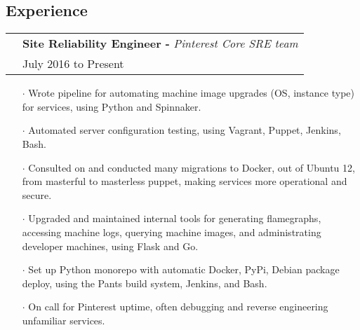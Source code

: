\documentclass[letterpaper, oneside, final]{scrartcl} %
\newcommand{\gray}{\rowcolor[gray]{.90}} %
\begin{document}
\begin{center}
\vspace{-0.8cm}

\section{Experience}

\renewcommand{\arraystretch}{1.3}

\begin{tabularx}{0.97\linewidth}{>{\raggedleft\scshape}p{0cm}X}
\gray & \textbf{Site Reliability Engineer -} \textit{Pinterest Core SRE team}\\
\gray & {July 2016 to Present}\\
\end{tabularx}
\vspace{-0.1cm}
\begin{itemize} \itemsep-0.2cm
\item[$\cdot$] Wrote pipeline for automating machine image upgrades (OS, instance type) for services, using Python and Spinnaker.\\
\item[$\cdot$] Automated server configuration testing, using Vagrant, Puppet, Jenkins, Bash.\\
\item[$\cdot$] Consulted on and conducted many migrations to Docker, out of Ubuntu 12, from masterful to masterless puppet, making services more operational and secure.\\
\item[$\cdot$] Upgraded and maintained internal tools for generating flamegraphs, accessing machine logs, querying machine images, and administrating developer machines, using Flask and Go.\\
\item[$\cdot$] Set up Python monorepo with automatic Docker, PyPi, Debian package deploy, using the Pants build system, Jenkins, and Bash.\\
\item[$\cdot$] On call for Pinterest uptime, often debugging and reverse engineering unfamiliar services.\\
\end{itemize}


\end{center}
\end{document}
